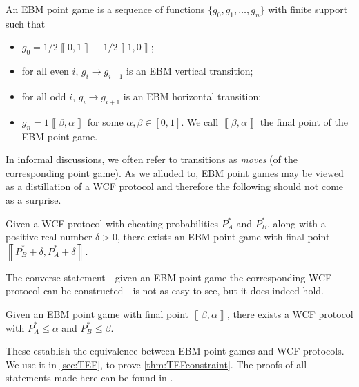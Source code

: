\documentclass{theoretics}
\begin{document}
%

%
\begin{definition}
  \label{def:EBMpointGame} An EBM point game is a sequence of functions
  $\{g_{0},g_{1},\dots,g_{n}\}$ with finite support such that
  \begin{itemize}
    \item $g_{0}=1/2\left\llbracket 0,1\right\rrbracket +1/2\left\llbracket 1,0\right\rrbracket $;
    \item for all even $i$, $g_{i}\to g_{i+1}$ is an EBM vertical transition;
    \item for all odd $i$, $g_{i}\to g_{i+1}$ is an EBM horizontal transition;
    \item $g_{n}=1\left\llbracket \beta,\alpha\right\rrbracket $ for some $\alpha,\beta\in[0,1]$.
          We call $\left\llbracket \beta,\alpha\right\rrbracket $ the final
          point of the EBM point game.
  \end{itemize}
\end{definition}

%
In informal discussions, we often refer to transitions as \emph{moves} (of the corresponding point game).
%
As we alluded to, EBM point games may be viewed as a distillation of a WCF protocol and therefore the following should not come as a surprise.
%
%
%

\begin{proposition}
  \label{prop:WCFimpliesEBMPointGame}Given a WCF protocol with cheating
  probabilities $P_{A}^{*}$ and $P_{B}^{*}$, along with a positive
  real number $\delta>0$, there exists an EBM point game with final
  point $\left\llbracket P_{B}^{*}+\delta,P_{A}^{*}+\delta\right\rrbracket $.
\end{proposition}


The converse statement---given
an EBM point game the corresponding WCF protocol can be constructed---is not as easy to see, but it does indeed hold.
%
\begin{theorem}
  \label{thm:EBMpointGameToWCFprotocol}Given an EBM point game with
  final point $\left\llbracket\beta,\alpha\right\rrbracket$, there exists a WCF protocol with $P_{A}^{*}\le\alpha$
  and $P_{B}^{*}\le\beta$.
\end{theorem}
These establish the equivalence between EBM point games and WCF protocols. We use it in \cref{sec:TEF}, to prove \cref{thm:TEFconstraint}. The proofs of all statements made here can be found in \cite{Mochon07,ACG+14}. %
\end{document}
